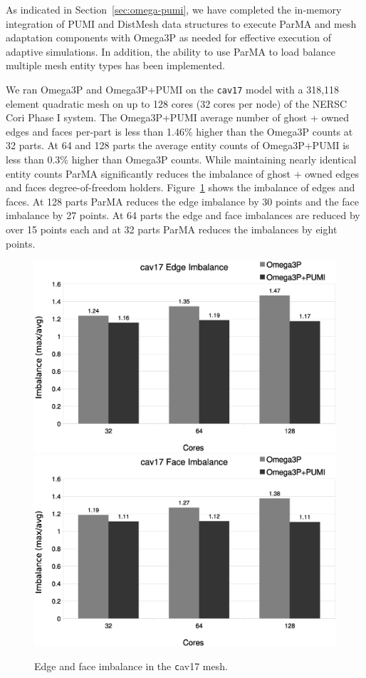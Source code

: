 \documentclass[a4paper]{article}
\begin{document}
As indicated in Section~\ref{sec:omega-pumi}, we have completed the in-memory
integration of PUMI and DistMesh data structures to execute ParMA and mesh
adaptation components with Omega3P as needed for effective execution of adaptive
simulations.
In addition, the ability to use ParMA to load balance multiple mesh entity
types has been implemented.

We ran Omega3P and Omega3P+PUMI on the \texttt{cav17} model with a 318,118
element quadratic mesh on up to 128 cores (32 cores per node) of the NERSC Cori
Phase I system.
The Omega3P+PUMI average number of ghost + owned edges and faces per-part
is less than 1.46\% higher than the Omega3P counts at 32 parts.
At 64 and 128 parts the average entity counts of Omega3P+PUMI is less than 0.3\%
higher than Omega3P counts.
While maintaining nearly identical entity counts ParMA significantly reduces the
imbalance of ghost + owned edges and faces degree-of-freedom holders.
Figure~\ref{fig:cav17imb} shows the imbalance of edges and faces.
At 128 parts ParMA reduces the edge imbalance by 30 points and the face
imbalance by 27 points.
At 64 parts the edge and face imbalances are reduced by over 15 points each and
at 32 parts ParMA reduces the imbalances by eight points.

\begin{figure}[ht]
\centering
  \includegraphics[width=\textwidth]{cav17-edge-imb.eps} \\
  \includegraphics[width=\textwidth]{cav17-face-imb.eps} \\
  \caption{\label{fig:cav17imb} Edge and face imbalance in the {\texttt cav17} mesh.}
\end{figure}
\end{document}
